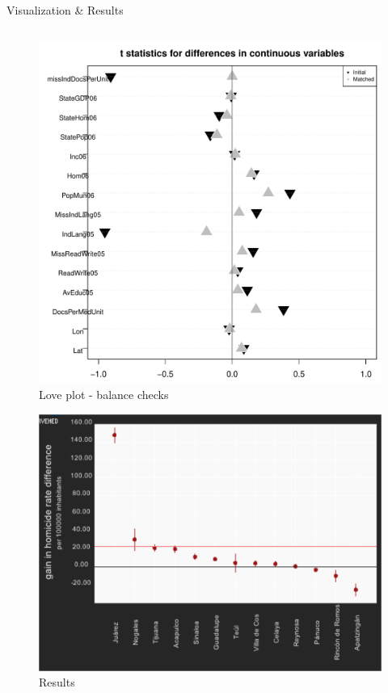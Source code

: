 \documentclass[final]{beamer}
\newlength{\onecolwid}
\newlength{\twocolwid}
\begin{document}
\begin{frame}[t]
\begin{columns}[t]
\begin{column}{\twocolwid}
\begin{block}{ Visualization \& Results}
        \begin{columns}[t,totalwidth=\twocolwid]
          \begin{column}{\onecolwid}
            \begin{figure}[htdp]
              \includegraphics[scale=1]{../Images/FinalLoveplot.pdf}
              \caption*{Love plot - balance checks}
            \end{figure}

             \begin{figure}[htdp]
               \includegraphics[scale=1.1]{../Images/results.png}
              \caption*{Results}
            \end{figure}
          \end{column}


\end{columns}
\end{block}
\end{column}
\end{columns}
\end{frame}
\end{document}
